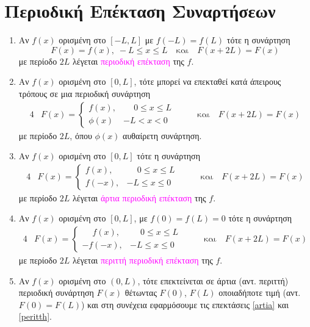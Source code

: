 \section{Περιοδική Επέκταση Συναρτήσεων}

\vspace{\baselineskip}

\begin{enumerate}

    \item Αν $ f(x) $ ορισμένη στο $ [-L,L] $ με $ f(-L)=f(L) $ τότε η συνάρτηση
        \[
            F(x) = f(x), \; -L \leq x \leq L \quad \text{και} \quad F(x+2L)=F(x)
        \]
        με περίοδο $ 2L $ λέγεται \textcolor{magenta}{περιοδική επέκταση} της $f$. 

    \item Αν $ f(x) $ ορισμένη στο $ [0,L] $, τότε μπορεί να επεκταθεί κατά άπειρους τρόπους 
        σε μια περιοδική συνάρτηση 
        \begin{alignat*}{4}
            &F(x) = 
            \begin{cases}  
            f(x), & \phantom{-} 0 \leq x \leq L \\
            \phi(x) & -L < x < 0
        \end{cases}  & \quad & \text{και} \quad F(x+2L)=F(x)
        \end{alignat*}
        με περίοδο $ 2L $, όπου $ \phi(x) $ αυθαίρετη συνάρτηση. 

    \item \label{artia} Αν $ f(x) $ ορισμένη στο $ [0,L] $ τότε η συνάρτηση 
        \begin{alignat*}{4}
            &F(x) = 
            \begin{cases}  
            f(x), & \phantom{-} 0 \leq x \leq L \\
            f(-x), & -L \leq x \leq 0
        \end{cases}  & \quad & \text{και} \quad F(x+2L)=F(x)
        \end{alignat*}
        με περίοδο $ 2L $ λέγεται \textcolor{magenta}{άρτια περιοδική επέκταση} της $f$.

    \item \label{peritth} Αν $ f(x) $ ορισμένη στο $ [0,L] $, με $ f(0)=f(L)=0 $ τότε η συνάρτηση
        \begin{alignat*}{4}
            &F(x) = 
            \begin{cases}  
            \phantom{-} f(x), & \phantom{-} 0 \leq x \leq L \\
            -f(-x), & -L \leq x \leq 0
        \end{cases}  & \quad & \text{και} \quad F(x+2L)=F(x)
        \end{alignat*}
        με περίοδο $ 2L $ λέγεται \textcolor{magenta}{περιττή περιοδική επέκταση} της $f$.

    \item Αν $ f(x) $ ορισμένη στο $ (0,L) $, τότε επεκτείνεται σε άρτια (αντ. περιττή) περιοδική
        συνάρτηση $ F(x) $ θέτωντας $ F(0) $, $ F(L) $ οποιαδήποτε τιμή (αντ. $F(0)=F(L)$) και στη
        συνέχεια εφαρμόσουμε τις επεκτάσεις \ref{artia} και \ref{peritth}.

\end{enumerate}






